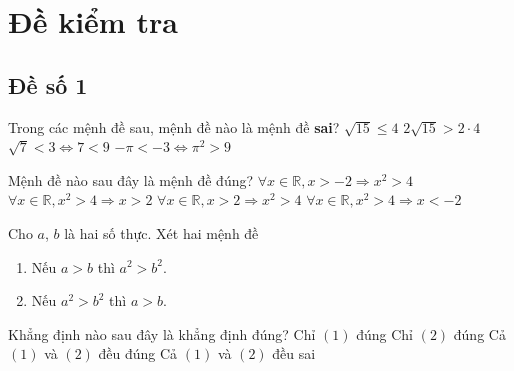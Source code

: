 \section{Đề kiểm tra}
\subsection*{Đề số 1}
\begin{ex}%
	Trong các mệnh đề sau, mệnh đề nào là mệnh đề {\bf sai}?
	\choice
	{$\sqrt{15} \le 4$}
	{\True $2\sqrt{15}>2\cdot 4$}
	{$\sqrt{7}<3 \Leftrightarrow 7<9$}
	{$-\pi <-3 \Leftrightarrow \pi^2>9$}
\end{ex}

\begin{ex}%
	Mệnh đề nào sau đây là mệnh đề đúng?
	\choice
	{$\forall x \in \mathbb{R},x>-2 \Rightarrow x^2>4$}
	{$\forall x \in \mathbb{R},x^2>4 \Rightarrow x>2$}
	{\True $\forall x \in \mathbb{R},x> 2 \Rightarrow x^2>4$}
	{$\forall x \in \mathbb{R},x^2>4 \Rightarrow x<-2$}
\end{ex}

\begin{ex}%
	Cho $a$, $b$ là hai số thực. Xét hai mệnh đề
	\begin{enumerate}[(1)]
		\item Nếu $a>b$ thì $a^2>b^2$.
		\item Nếu $a^2>b^2$ thì $a>b$.
	\end{enumerate}
	Khẳng định nào sau đây là khẳng định đúng?
	\choice
	{Chỉ $(1)$ đúng}
	{Chỉ $(2)$ đúng}
	{Cả $(1)$ và $(2)$ đều đúng}
	{\True Cả $(1)$ và $(2)$ đều sai}
\end{ex}

